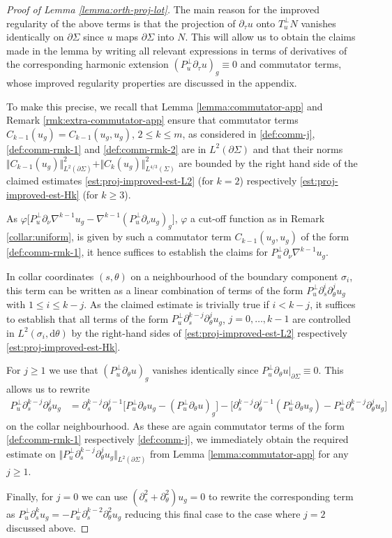 \documentclass[10pt,reqno]{amsart}
\theoremstyle{plain}
\theoremstyle{definition}
\newcommand{\ptheta}{\partial_\theta}
\newcommand{\pnu}{\partial_\nu}
\numberwithin{equation}{section}
\newcommand{\si}{\sigma}
\newcommand{\Si}{\Sigma}
\newcommand{\norm}[1]{\Vert#1\Vert}
\newcommand{\beqas}{\begin{equation*}\begin{aligned}}
\newcommand{\eeqas}{\end{aligned}\end{equation*}}
\newcommand{\dd}{\mathrm{d}} %
\newcommand{\ps}{\partial_s}
\newcommand{\na}{\nabla}
\newcommand{\pSi}{{\partial \Sigma}}
\newcommand{\p}{\partial} %
\newcommand{\ptau}{\partial_\tau}
\begin{document}
\begin{proof}[Proof of Lemma \ref{lemma:orth-proj-lot}]
    The main reason for the improved regularity of the above terms is that the projection of $\p_\tau u$ onto $T_u^\perp N$ vanishes identically on $\pSi$ since $u$ maps $\pSi$ into $N$. This will allow us to obtain the claims made in the lemma by writing all relevant expressions in terms of derivatives of the corresponding harmonic extension $(P_u^\perp \ptau u)_g\equiv 0$ and commutator terms, whose improved regularity properties are discussed in the appendix. 
    
    To make this precise, we recall that  Lemma \ref{lemma:commutator-app} and Remark \ref{rmk:extra-commutator-app} ensure that commutator terms $C_{k-1}(u_g)=C_{k-1}(u_g,u_g)$, $2\leq k\leq m$, as considered in \eqref{def:comm-j},  \eqref{def:comm-rmk-1} and \eqref{def:comm-rmk-2} are in $L^2(\pSi)$ and that their norms $\norm{C_{k-1}(u_g)}_{L^2(\pSi)}^2+\norm{C_{k}(u_g)}_{L^{4/3}(\Si)}^2$ are bounded by the right hand side of the claimed estimates \eqref{est:proj-improved-est-L2} (for $k=2$) respectively \eqref{est:proj-improved-est-Hk} (for $k\geq 3$). 
    
    As $\varphi\big [P_u^\perp\pnu \nabla^{k-1} u_{g}-\na^{k-1} (P_u^\perp\pnu u_{g})_g\big]$, $\varphi$ a cut-off function as in Remark \ref{collar:uniform}, is given by such a commutator term $C_{k-1}(u_g,u_g)$ of the form \eqref{def:comm-rmk-1}, it hence suffices to establish the claims for $P_u^\perp\pnu \nabla^{k-1} u_{g}$.
    
    In collar coordinates $(s,\theta)$ on a neighbourhood of the boundary component $\si_i$, this term can be written as a linear combination of terms of the form $P_u^{\perp }\ps^{i}\ptheta^{j} u_{g}$ with $1\leq i\leq k-j$. As the claimed estimate is trivially true if $i<k-j$, it suffices to establish that all terms of the form $P_u^{\perp }\ps^{k-j}\ptheta^{j} u_{g}$, $j=0,\ldots, k-1$ are controlled in $L^2(\si_i,\dd\theta)$ by the right-hand sides of \eqref{est:proj-improved-est-L2} respectively \eqref{est:proj-improved-est-Hk}. 
    
    For $j\geq 1$ we use that $(P_u^\perp \ptheta u)_g$ vanishes identically since  $P_u^\perp \ptheta u\vert_\pSi\equiv 0$. This allows us to rewrite
    \beqas 
        P_u^{\perp}\ps^{k-j}\ptheta^{j} u_{g} &= \ps^{k-j}\ptheta^{j-1} \big[ P_u^{\perp}\ptheta u_{g} -(P_u^{\perp}\ptheta u)_{g}\big] -\big[\ps^{k-j}\ptheta^{j-1}  (P_u^{\perp}\ptheta u_{g}) -P_u^{\perp}\ps^{k-j}\ptheta^{j} u_{g}]
    \eeqas
    on the collar neighbourhood. As these are again commutator terms of the form \eqref{def:comm-rmk-1} respectively \eqref{def:comm-j}, we immediately obtain the required estimate on $\norm{P_u^{\perp}\ps^{k-j}\ptheta^{j} u_{g}}_{L^2(\pSi)}$ from Lemma \ref{lemma:commutator-app} for any $j\geq 1$.
     
    Finally, for $j=0$ we can use $(\ps^2+\ptheta^2)u_g=0$ to rewrite the corresponding term as  $P_u^{\perp}\ps^{k} u_{g}=-P_u^{\perp}\ps^{k-2}\ptheta^{2} u_{g}$ reducing this final case to the case where $j=2$ discussed above. 
\end{proof}
\end{document}
